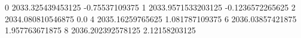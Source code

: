 0 2033.325439453125 -0.75537109375
1 2033.9571533203125 -0.1236572265625
2 2034.080810546875 0.0
4 2035.16259765625 1.081787109375
6 2036.03857421875 1.957763671875
8 2036.202392578125 2.12158203125
